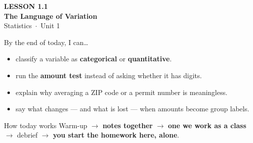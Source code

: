 \documentclass[aspectratio=169, 11pt]{beamer}
\begin{document}
{
\begin{frame}[plain]
  \vspace{2.8cm}\hspace{0.55cm}%
  \begin{minipage}{0.9\textwidth}
    {\color{goldacc}\bfseries\small LESSON 1.1}\\[0.5cm]
    {\color{white}\bfseries\LARGE The Language of Variation}\\[1.2cm]
    {\color{skymid}\small Statistics~$\cdot$~Unit 1}
  \end{minipage}
\end{frame}
}

\newcommand{\redink}[1]{{\color{redacc}\bfseries #1}}

\begin{frame}[t, plain]
  By the end of today, I can\ldots
  \begin{itemize}\setlength{\itemsep}{5pt}
    \item classify a variable as \textbf{categorical} or \textbf{quantitative}.
    \item run the \textbf{amount test} instead of asking whether it has digits.
    \item explain why averaging a ZIP code or a permit number is meaningless.
    \item say what changes --- and what is lost --- when amounts become group labels.
  \end{itemize}
  \begin{block}{How today works}
    Warm-up $\to$ \textbf{notes together} $\to$ \textbf{one we work as a class} $\to$
    debrief $\to$ \textbf{you start the homework here, alone}.
  \end{block}
\end{frame}
\end{document}
